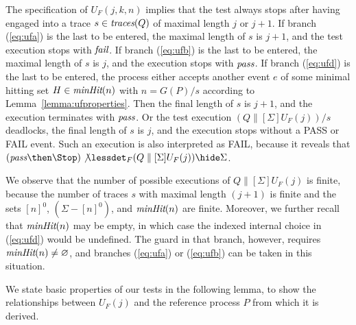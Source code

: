 The specification of $U_F(j,k,n)$ implies that the test always stops after
having engaged into a trace $s\in\text{\it traces}(Q)$ of maximal length $j$ or $j+1$. If
branch (\ref{eq:ufa}) is the last to be entered, the maximal length of $s$ is
$j+1$, and the test execution stops with ${\text{\it fail}}$. If branch (\ref{eq:ufb})
is the last to be entered, the maximal length of $s$ is $j$, and the
execution stops with ${\text{\it pass}}$. If branch (\ref{eq:ufd}) is the last to be
entered, the process either accepts another event $e$ of some minimal hitting
set $H\in\text{\it minHit}(n)$ with $n = G(P)/s$ according to
Lemma~\ref{lemma:ufproperties}. Then the final length of $s$ is $j+1$, and
the execution terminates with ${\text{\it pass}}$. Or the test execution
$(Q\parallel[\Sigma] U_F(j))/s$ deadlocks,  the final length of $s$ is $j$,
and the execution stops without a PASS or FAIL event. Such an execution is
also interpreted as FAIL, because it reveals that $(\epass\then\Stop)
\not\lessdet_F (Q\parallel[\Sigma] U_F(j)) \hide \Sigma$.

We observe that the number of possible executions of $Q\parallel[\Sigma]
U_F(j)$ is finite, because the number of traces $s$ with maximal length
$(j+1)$ is finite and the sets $[n]^0$, $(\Sigma - [n]^0)$, and $\text{\it minHit}(n)$
are finite. Moreover, we further recall that $\text{\it minHit}(n)$ may be empty, in
which case the indexed internal choice in (\ref{eq:ufd}) would be undefined.
The guard in that branch, however, requires $\text{\it minHit}(n)\neq\varnothing$, and
branches (\ref{eq:ufa}) or (\ref{eq:ufb}) can be taken in this situation.



We state basic properties of our tests in the following lemma, to show the
relationships between $U_F(j)$ and the reference process $P$ from which it is
derived.

